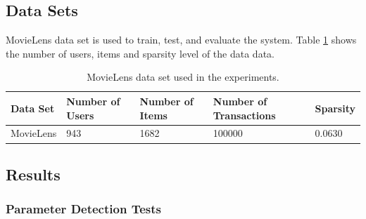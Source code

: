 \documentclass[conference]{IEEEtran}
\begin{document}
\subsection{Data Sets}
MovieLens data set is used to train, test, and evaluate the system. Table 
\ref{table:data-set} shows the number of users, items and sparsity level of 
the data data.

\begin{table}[!ht]
\centering
\begin{tabularx}{0.45\textwidth}{XXXXX}
\hline
Data Set & Number of \newline Users & Number of \newline Items & Number of \newline Transactions & Sparsity \\
\hline
MovieLens     & 943	& 1682	  & 100000   & 0.0630   \\
\hline
\end{tabularx}
\caption{MovieLens data set used in the experiments.}
\label{table:data-set}
\end{table}


\subsection{Results}
\label{subsec:results}

\subsubsection{Parameter Detection Tests}
\label{subsubsec:parameter_detect}
\end{document}
